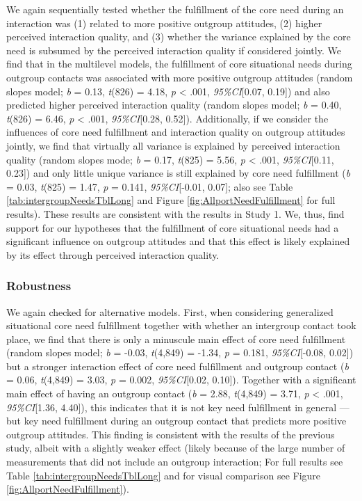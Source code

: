 We again sequentially tested whether the fulfillment of the core need
during an interaction was (1) related to more positive outgroup
attitudes, (2) higher perceived interaction quality, and (3) whether the
variance explained by the core need is subsumed by the perceived
interaction quality if considered jointly. We find that in the
multilevel models, the fulfillment of core situational needs during
outgroup contacts was associated with more positive outgroup attitudes
(random slopes model; \textit{b} = 0.13, \textit{t}(826) = 4.18,
\textit{p} \textless{} .001, \textit{95\%CI}{[}0.07, 0.19{]}) and also
predicted higher perceived interaction quality (random slopes model;
\textit{b} = 0.40, \textit{t}(826) = 6.46, \textit{p} \textless{} .001,
\textit{95\%CI}{[}0.28, 0.52{]}). Additionally, if we consider the
influences of core need fulfillment and interaction quality on outgroup
attitudes jointly, we find that virtually all variance is explained by
perceived interaction quality (random slopes mode; \textit{b} = 0.17,
\textit{t}(825) = 5.56, \textit{p} \textless{} .001,
\textit{95\%CI}{[}0.11, 0.23{]}) and only little unique variance is
still explained by core need fulfillment (\textit{b} = 0.03,
\textit{t}(825) = 1.47, \textit{p} = 0.141, \textit{95\%CI}{[}-0.01,
0.07{]}; also see Table \ref{tab:intergroupNeedsTblLong} and Figure
\ref{fig:AllportNeedFulfillment} for full results). These results are
consistent with the results in Study 1. We, thus, find support for our
hypotheses that the fulfillment of core situational needs had a
significant influence on outgroup attitudes and that this effect is
likely explained by its effect through perceived interaction quality.

\subsubsection{Robustness}

We again checked for alternative models. First, when considering
generalized situational core need fulfillment together with whether an
intergroup contact took place, we find that there is only a minuscule
main effect of core need fulfillment (random slopes model; \textit{b} =
-0.03, \textit{t}(4,849) = -1.34, \textit{p} = 0.181,
\textit{95\%CI}{[}-0.08, 0.02{]}) but a stronger interaction effect of
core need fulfillment and outgroup contact (\textit{b} = 0.06,
\textit{t}(4,849) = 3.03, \textit{p} = 0.002, \textit{95\%CI}{[}0.02,
0.10{]}). Together with a significant main effect of having an outgroup
contact (\textit{b} = 2.88, \textit{t}(4,849) = 3.71, \textit{p}
\textless{} .001, \textit{95\%CI}{[}1.36, 4.40{]}), this indicates that
it is not key need fulfillment in general --- but key need fulfillment
during an outgroup contact that predicts more positive outgroup
attitudes. This finding is consistent with the results of the previous
study, albeit with a slightly weaker effect (likely because of the large
number of measurements that did not include an outgroup interaction; For
full results see Table \ref{tab:intergroupNeedsTblLong} and for visual
comparison see Figure \ref{fig:AllportNeedFulfillment}).

